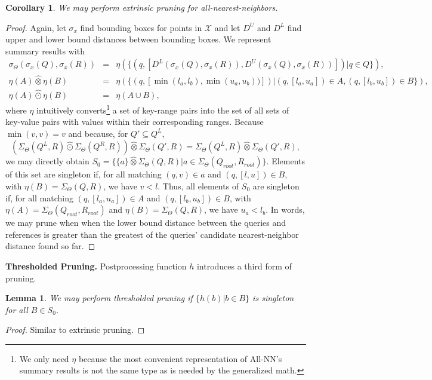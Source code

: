\documentclass{article}
\newtheorem{lemma}{Lemma}
\newtheorem{corollary} {Corollary}
\newcommand{\GNP}[1][\psi]{{#1}_{\Theta}}
\newcommand{\otimeshat}{\mathbin{\widehat{\otimes}}}
\newcommand{\odothat}{\mathbin{\widehat{\odot}}}
\begin{document}
\begin{corollary}
  We may perform extrinsic pruning for all-nearest-neighbors.
\end{corollary}
\begin{proof}
  Again, let $\sigma_x$ find bounding boxes for points in
  $\mathcal{X}$ and let $D^{\!U}$ and $D^{\!L}$ find upper and lower
  bound distances between bounding boxes.  We represent summary
  results with
  \begin{eqnarray*}
    \GNP[\sigma](\sigma_x(Q),\sigma_x(R)) & = & \eta(\{(q,[D^{\!L}(\sigma_x(Q),\sigma_x(R)), D^{\!U}(\sigma_x(Q),\sigma_x(R))]) | q \in Q\}), \\
    \eta(A) \otimeshat \eta(B) & = & \eta(\{(q,[\min(l_a,l_b),\min(u_a,u_b))]) | (q,[l_a,u_a]) \in A, (q,[l_b,u_b]) \in B\}), \\
    \eta(A) \odothat \eta(B) & = & \eta(A \cup B),
  \end{eqnarray*}
  where $\eta$ intuitively converts\footnote{We only need $\eta$
  because the most convenient representation of All-NN's summary
  results is not the same type as is needed by the generalized math.}
  a set of key-range pairs into the set of all sets of key-value pairs
  with values within their corresponding ranges.  Because $\min(v,v) =
  v$ and because, for $Q' \subseteq Q^{\!L}$,
  \[
  (\GNP[\Sigma](Q^{\!L},R) \odothat \GNP[\Sigma](Q^{\!R},R)) \otimeshat \GNP[\Sigma](Q',R) = \GNP[\Sigma](Q^{\!L},R) \otimeshat \GNP[\Sigma](Q',R),
  \]
  we may directly obtain $S_0 = \{\{a\} \otimeshat \GNP[\Sigma](Q,R) |
  a \in \GNP[\Sigma](Q_{root},R_{root})\}$.  Elements of this set are
  singleton if, for all matching $(q,v) \in a$ and $(q,[l,u]) \in B$,
  with $\eta(B) = \GNP[\Sigma](Q,R)$, we have $v < l$.  Thus, all
  elements of $S_0$ are singleton if, for all matching $(q,[l_a,u_a])
  \in A$ and $(q,[l_b,u_b]) \in B$, with $\eta(A) =
  \GNP[\Sigma](Q_{root},R_{root})$ and $\eta(B) = \GNP[\Sigma](Q,R)$, we
  have $u_a < l_b$.  In words, we may prune when when the lower bound
  distance between the queries and references is greater than the
  greatest of the queries' candidate nearest-neighbor distance found
  so far.
\end{proof}


{\bf Thresholded Pruning.}  Postprocessing function $h$ introduces a
third form of pruning.
\begin{lemma}
  We may perform {\em thresholded pruning} if $\{h(b) | b \in B\}$ is
  singleton for all $B \in S_0$.
\end{lemma}
\begin{proof}
  Similar to extrinsic pruning.
\end{proof}
\end{document}
